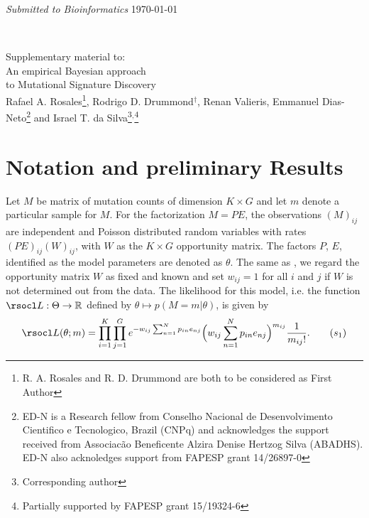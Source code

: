 \documentclass[11pt]{amsart}
\theoremstyle{definition}
\begin{document}
\title[\textup{R. A. Rosales, R. D. Drummond,
       R. Valieris, E. Dias-Neto, I. T. da Silva}]{}
\noindent\parbox{\linewidth}{\footnotesize %
    {\footnotesize\textsl{Submitted to Bioinformatics }}
    {\footnotesize\textrm{\hfill\today}}
  }\\[1em]
 \begin{center}
   {\large Supplementary material to:}\\[1em]
   {\Large\sc An empirical Bayesian approach}\\[0.3em]
   {\Large\sc to Mutational Signature Discovery}\\[2em]
   {\large
     Rafael A. Rosales\footnote{R. A. Rosales and R. D. Drummond are
       both to be considered as First Author},
     Rodrigo D. Drummond$^\dagger$,
     Renan Valieris, Emmanuel Dias-Neto\footnote{ED-N is a Research
       fellow from Conselho Nacional de Desenvolvimento Cientifico
       e Tecnologico, Brazil (CNPq) and acknowledges the support
       received from Associac\~ao Beneficente Alzira Denise Hertzog
       Silva (ABADHS). ED-N also acknoledges support from FAPESP grant
       14/26897-0} and
     Israel T. da Silva\footnote{Corresponding
       author}$^,$\footnote{Partially supported by FAPESP grant
       15/19324-6}}
 \end{center}

\maketitle

\tableofcontents

\section{Notation and preliminary Results}
Let $M$ be matrix of mutation counts of dimension $K\times G$ and let
$m$ denote a particular sample for $M$. For the factorization $M=PE$,
the observations $(M)_{ij}$ are independent and Poisson distributed
random variables with rates $(PE)_{ij}(W)_{ij}$, with $W$ as the
$K\times G$ opportunity matrix. The factors $P$, $E$, identified as
the model parameters are denoted as $\theta$. The same as
\cite{FICMV}, we regard the opportunity matrix $W$ as fixed and known
and set $w_{ij} = 1$ for all $i$ and $j$ if $W$ is not determined out
from the data. The likelihood for this model, i.e. the function
$\rsocl L: \Theta \to \mathbb R$ defined by $\theta \mapsto
p(M=m|\theta)$, is given by
\begin{equation}
  \label{eqn:PoisLik}
   \rsocl L(\theta; m)
   =
    \prod_{i=1}^K \prod_{j=1}^G e^{-w_{ij}\sum_{n=1}^{N}p_{in}e_{nj}}
    \Big(w_{ij}\sum_{n=1}^{N}p_{in}e_{nj}\Big)^{m_{ij}}
    \frac{1}{m_{ij}!}.\tag{$s_1$}
\end{equation}
\end{document}
